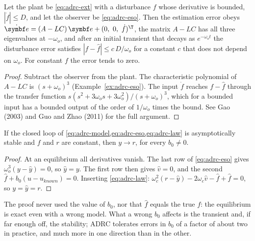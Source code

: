 \begin{theorem}
\label{thm:adrc-eso}
Let the plant be \cref{eq:adrc-ext} with a disturbance $f$ whose derivative is bounded, $|\dot f| \le D$, and let the observer be \cref{eq:adrc-eso}. Then the estimation error obeys $\dot{\symbf e} = (A - LC)\,\symbf e + (0,\ 0,\ \dot f)^\T$, the matrix $A - LC$ has all three eigenvalues at $-\omega_o$, and after an initial transient that decays as $e^{-\omega_ot}$ the disturbance error satisfies $|f - \hat f| \le c\,D/\omega_o$ for a constant $c$ that does not depend on $\omega_o$. For constant $f$ the error tends to zero.
\end{theorem}
\begin{proof}
Subtract the observer from the plant. The characteristic polynomial of $A - LC$ is $(s + \omega_o)^3$ (Example~\ref{ex:adrc-eso}). The input $\dot f$ reaches $f - \hat f$ through the transfer function $s(s^2 + 3\omega_os + 3\omega_o^2)/(s + \omega_o)^3$, which for a bounded input has a bounded output of the order of $1/\omega_o$ times the bound. See Gao (2003) and Guo and Zhao (2011) for the full argument.
\end{proof}

\begin{theorem}
\label{thm:adrc-zero}
If the closed loop of \cref{eq:adrc-model,eq:adrc-eso,eq:adrc-law} is asymptotically stable and $f$ and $r$ are constant, then $y \to r$, for every $b_0 \ne 0$.
\end{theorem}
\begin{proof}
At an equilibrium all derivatives vanish. The last row of \cref{eq:adrc-eso} gives $\omega_o^3(y - \hat y) = 0$, so $\hat y = y$. The first row then gives $\hat v = 0$, and the second $\hat f + b_0(u - u_{known}) = 0$. Inserting \cref{eq:adrc-law}: $\omega_c^2(r - \hat y) - 2\omega_c\hat v - \hat f + \hat f = 0$, so $y = \hat y = r$.
\end{proof}

The proof never used the value of $b_0$, nor that $\hat f$ equals the true $f$: the equilibrium is exact even with a wrong model. What a wrong $b_0$ affects is the transient and, if far enough off, the stability; ADRC tolerates errors in $b_0$ of a factor of about two in practice, and much more in one direction than in the other.

